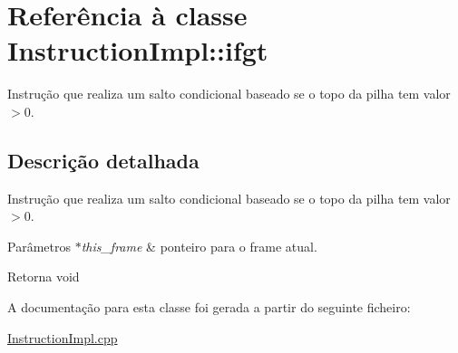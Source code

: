 \hypertarget{class_instruction_impl_1_1ifgt}{}\section{Referência à classe Instruction\+Impl\+:\+:ifgt}
\label{class_instruction_impl_1_1ifgt}


Instrução que realiza um salto condicional baseado se o topo da pilha tem valor $>$0.  




\subsection{Descrição detalhada}
Instrução que realiza um salto condicional baseado se o topo da pilha tem valor $>$0. 


\begin{DoxyParams}{Parâmetros}
{\em $\ast$this\+\_\+frame} & ponteiro para o frame atual. \\
\hline
\end{DoxyParams}
\begin{DoxyReturn}{Retorna}
void 
\end{DoxyReturn}


A documentação para esta classe foi gerada a partir do seguinte ficheiro\+:\begin{DoxyCompactItemize}
\item 
\hyperlink{_instruction_impl_8cpp}{Instruction\+Impl.\+cpp}\end{DoxyCompactItemize}
